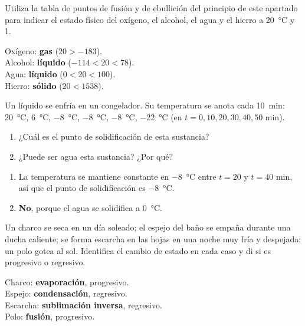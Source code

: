 \begin{exercise}
    Utiliza la tabla de puntos de fusión y de ebullición del principio de este apartado para indicar el estado físico del oxígeno, el alcohol, el agua y el hierro a \qty{20}{\celsius} y \qty{1}{\atmospher}.
    \begin{solu}
        Oxígeno: \textbf{gas} (\(20 > -183\)). \\
        Alcohol: \textbf{líquido} (\(-114 < 20 < 78\)). \\
        Agua: \textbf{líquido} (\(0 < 20 < 100\)). \\
        Hierro: \textbf{sólido} (\(20 < 1538\)).
    \end{solu}
\end{exercise}

\begin{exercise}
    Un líquido se enfría en un congelador. Su temperatura se anota cada \qty{10}{\minute}: \qty{20}{\celsius}, \qty{6}{\celsius}, \qty{-8}{\celsius}, \qty{-8}{\celsius}, \qty{-8}{\celsius}, \qty{-22}{\celsius} (en \(t = 0, 10, 20, 30, 40, 50\) min).
    \begin{enumerate}[label=\letraminuscula]
        \item ¿Cuál es el punto de solidificación de esta sustancia?
        \item ¿Puede ser agua esta sustancia? ¿Por qué?
    \end{enumerate}
    \begin{solu}
        \begin{enumerate}[label=\alph*)]
            \item La temperatura se mantiene constante en \qty{-8}{\celsius} entre \(t = 20\) y \(t = 40\) min, así que el punto de solidificación es \qty{-8}{\celsius}.
            \item \textbf{No}, porque el agua se solidifica a \qty{0}{\celsius}.
        \end{enumerate}
    \end{solu}
\end{exercise}

\begin{exercise}
    Un charco se seca en un día soleado; el espejo del baño se empaña durante una ducha caliente; se forma escarcha en las hojas en una noche muy fría y despejada; un polo gotea al sol. Identifica el cambio de estado en cada caso y di si es progresivo o regresivo.
    \begin{solu}
        Charco: \textbf{evaporación}, progresivo. \\
        Espejo: \textbf{condensación}, regresivo. \\
        Escarcha: \textbf{sublimación inversa}, regresivo. \\
        Polo: \textbf{fusión}, progresivo.
    \end{solu}
\end{exercise}

